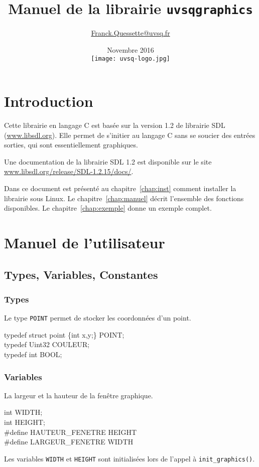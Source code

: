 \documentclass{report}
\title{Manuel de la librairie \texttt{uvsqgraphics}}
\author{\href{mailto:Franck.Quessette@uvsq.fr?Subject=uvsqgraphics}{Franck.Quessette@uvsq.fr}}
\date{Novembre 2016\\\texttt{[image: uvsq-logo.jpg]}}
\newcommand\code[1]{
\begin{mdframed}[linecolor=purple,backgroundcolor=blue!10]
{\tt
#1
}
\end{mdframed}
}
\begin{document}
\maketitle
\tableofcontents

\chapter{Introduction}
Cette librairie en langage C est basée sur la version 1.2 de librairie SDL (\href{https://www.libsdl.org}{www.libsdl.org}).
Elle permet de s'initier au langage C sans se soucier des entrées sorties, qui sont essentiellement graphiques.

Une documentation de la librairie SDL 1.2 est disponible sur le site \href{https://www.libsdl.org/release/SDL-1.2.15/docs/}{www.libsdl.org/release/SDL-1.2.15/docs/}.

Dans ce document est présenté au chapitre~\ref{chap:inst} comment installer la librairie sous Linux. Le chapitre~\ref{chap:manuel} décrit l'ensemble des fonctions disponibles. Le chapitre~\ref{chap:exemple} donne un exemple complet.

\chapter{Manuel de l'utilisateur\label{chap:manuel}}
\section{Types, Variables, Constantes}

\subsection{Types}
Le type \texttt{POINT} permet de stocker les coordonnées d'un point.
\code{
typedef struct point \{int x,y;\} POINT; \\
typedef Uint32 COULEUR; \\
typedef int BOOL;
}

\subsection{Variables}
La largeur et la hauteur de la fenêtre graphique.
\code{
int WIDTH; \\
int HEIGHT; \\
\#define HAUTEUR\_FENETRE HEIGHT\\
\#define LARGEUR\_FENETRE WIDTH
}

\noindent
Les variables \texttt{WIDTH} et \texttt{HEIGHT} sont initialisées lors de l'appel à \texttt{init\_graphics()}.
\end{document}

